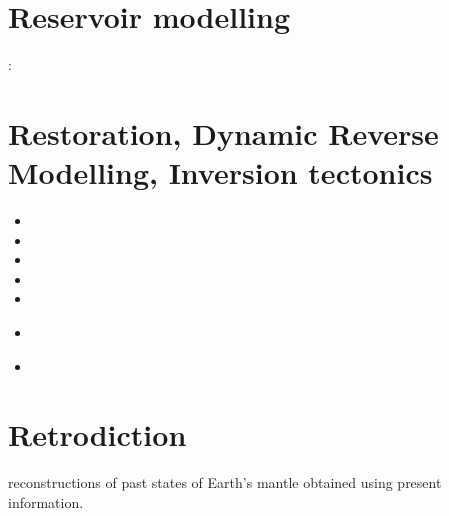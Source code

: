 \section{Reservoir modelling}

\begin{small}
\twothousandthirteen: 
\end{small}

\section{Restoration, Dynamic Reverse Modelling, Inversion tectonics}

\begin{small}
\begin{itemize}
\item[\twothousandone] 
\item[\twothousandfour] 
\item[\twothousandfive] 
\item[\twothousandtwelve] 
\item[\twothousandeighteen] 
\item[\twothousandtwenty] 
 \\
\item[\twothousandtwentyfour] 
\end{itemize}
\end{small}


\section{Retrodiction}
reconstructions of past states of Earth's mantle obtained using present information.

